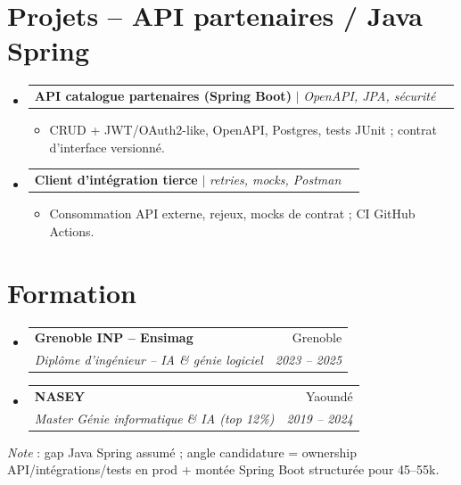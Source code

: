 \documentclass[a4paper,10.5pt]{article}
\makeatletter
\newcommand{\resumeItem}[1]{\item\small{#1}}
\newcommand{\resumeSubheading}[4]{\vspace{2.5pt}\item\begin{tabular*}{0.97\textwidth}[t]{l@{\extracolsep{\fill}}r}\textbf{#1}&{#2}\\\textit{\small #3}&\textit{\small #4}\\\end{tabular*}\vspace{1pt}}
\newcommand{\resumeProjectHeading}[2]{\vspace{1.5pt}\item\begin{tabular*}{0.97\textwidth}{l@{\extracolsep{\fill}}r}\small #1&#2\\\end{tabular*}\vspace{1pt}}
\newcommand{\resumeSubHeadingListStart}{\begin{itemize}[leftmargin=0.08in,label={}]}
\newcommand{\resumeSubHeadingListEnd}{\end{itemize}}
\makeatother
\begin{document}
\section{Projets -- API partenaires / Java Spring}
\resumeSubHeadingListStart
  \resumeProjectHeading{\textbf{API catalogue partenaires (Spring Boot)} $|$ \emph{OpenAPI, JPA, s\'ecurit\'e}}{}
  \begin{itemize}\resumeItem{CRUD + JWT/OAuth2-like, OpenAPI, Postgres, tests JUnit ; contrat d'interface versionn\'e.}\end{itemize}
  \resumeProjectHeading{\textbf{Client d'int\'egration tierce} $|$ \emph{retries, mocks, Postman}}{}
  \begin{itemize}\resumeItem{Consommation API externe, rejeux, mocks de contrat ; CI GitHub Actions.}\end{itemize}
\resumeSubHeadingListEnd

\section{Formation}
\resumeSubHeadingListStart
  \resumeSubheading{Grenoble INP -- Ensimag}{Grenoble}{Dipl\^ome d'ing\'enieur -- IA \& g\'enie logiciel}{2023 -- 2025}
  \resumeSubheading{NASEY}{Yaound\'e}{Master G\'enie informatique \& IA (top 12\%)}{2019 -- 2024}
\resumeSubHeadingListEnd

\vspace{3pt}
\small{\textit{Note} : gap Java Spring assum\'e ; angle candidature = ownership API/int\'egrations/tests en prod + mont\'ee Spring Boot structur\'ee pour 45--55k.}
\end{document}
